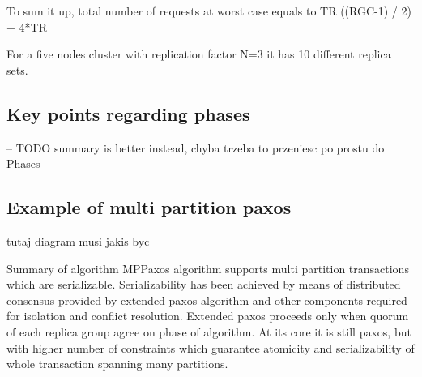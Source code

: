 To sum it up, total number of requests at worst case equals to 
TR ((RGC-1) / 2) + 4*TR


For a five nodes cluster with replication factor N=3 it has
10 different replica sets.




\subsection{Key points regarding phases} 
-- TODO summary is better instead, chyba trzeba to przeniesc po prostu do Phases


\subsection{Example of multi partition paxos}
tutaj diagram musi jakis byc




Summary of algorithm
MPPaxos algorithm supports multi partition transactions which are serializable. Serializability has been achieved by means of distributed consensus provided by extended paxos algorithm and other components required for isolation and conflict resolution. Extended paxos proceeds only when quorum of each replica group agree on phase of algorithm. At its core it is still paxos, but with higher number of constraints which guarantee atomicity and serializability of whole transaction spanning many partitions.